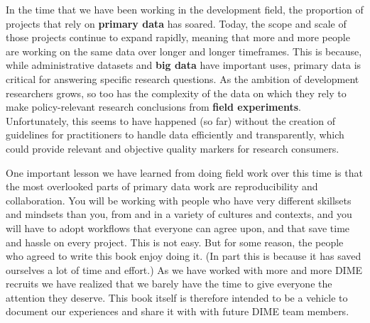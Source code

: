 In the time that we have been working in the development field,
the proportion of projects that rely on \textbf{primary data} has soared.\cite{angrist2017economic}
Today, the scope and scale of those projects continue to expand rapidly,
meaning that more and more people are working on the same data over longer and longer timeframes.
This is because, while administrative datasets
and \textbf{big data} have important uses,
primary data 
is critical for answering specific research questions.\cite{levitt2009field}
As the ambition of development researchers grows, so too has the complexity of the data
on which they rely to make policy-relevant research conclusions from \textbf{field experiments}.
Unfortunately, this seems to have happened (so far) without the creation of
guidelines for practitioners to handle data efficiently and transparently,
which could provide relevant and objective quality markers for research consumers.

One important lesson we have learned from doing field work over this time is that
the most overlooked parts of primary data work are reproducibility and collaboration.
You will be working with people
who have very different skillsets and mindsets than you,
from and in a variety of cultures and contexts, and you will have to adopt workflows
that everyone can agree upon, and that save time and hassle on every project.
This is not easy. But for some reason, the people who agreed to write this book enjoy doing it.
(In part this is because it has saved ourselves a lot of time and effort.)
As we have worked with more and more DIME recruits
we have realized that we barely have the time to give everyone the attention they deserve.
This book itself is therefore intended to be a vehicle to document our experiences and share it with with future DIME team members.

